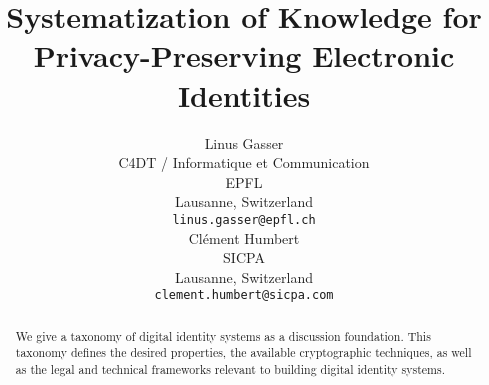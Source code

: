 \documentclass{article}
\title{Systematization of Knowledge for Privacy-Preserving Electronic Identities }
\author{
 Linus Gasser \\
  C4DT / Informatique et Communication \\
  EPFL \\
  Lausanne, Switzerland \\
  \texttt{linus.gasser@epfl.ch} \\
  \AND
 Cl\'ement Humbert \\
  SICPA \\
  Lausanne, Switzerland \\
  \texttt{clement.humbert@sicpa.com} \\
}
\begin{document}
\newcommand{\eid}{e-ID\xspace}
\newcommand{\rot}{Trust and Threats\xspace}
\newcommand{\sfi}{Solution Foundation and Implementation\xspace}
\newcommand{\rnf}{Regulatory and Normative Frameworks\xspace}
\newcommand{\swiyu}{Swiyu\xspace}

\maketitle
\begin{abstract}
We give a taxonomy of digital identity systems as a discussion foundation.
This taxonomy defines the desired properties, the available
cryptographic techniques, as well as the legal and technical
frameworks relevant to building digital identity systems.
\end{abstract}










  

\end{document}
